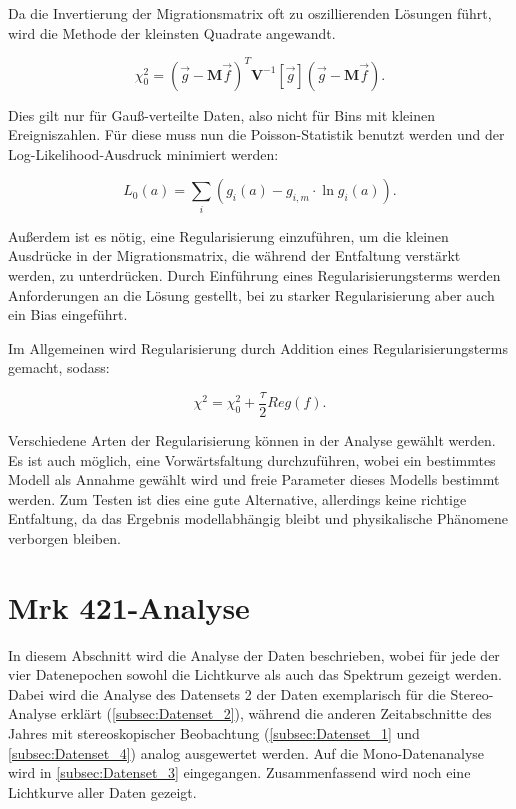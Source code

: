 Da die Invertierung der Migrationsmatrix oft zu oszillierenden Lösungen führt, wird die Methode der kleinsten Quadrate angewandt.

\begin{equation}
 \chi_0^2=(\vec{g}-\mathbf{M}\vec{f})^T \mathbf{V}^{-1}[\vec{g}](\vec{g}-\mathbf{M}\vec{f}).
\end{equation}

Dies gilt nur für Gauß-verteilte Daten, also nicht für Bins mit kleinen Ereigniszahlen.
Für diese muss nun die Poisson-Statistik benutzt werden und der Log-Likelihood-Ausdruck minimiert werden:

\begin{equation}
 L_0(a)=\sum_i (g_i(a)-g_{i,m}\cdot \ln g_i(a)).
\end{equation}

Außerdem ist es nötig, eine Regularisierung einzuführen, um die kleinen Ausdrücke in der Migrationsmatrix, die während der Entfaltung verstärkt werden, zu unterdrücken.
Durch Einführung eines Regularisierungsterms werden Anforderungen an die Lösung gestellt, bei zu starker Regularisierung aber auch ein Bias eingeführt.

Im Allgemeinen wird Regularisierung durch Addition eines Regularisierungsterms gemacht, sodass:

\begin{equation}
 \chi^2=\chi_0^2 +\frac{\tau}{2} Reg(f).
\end{equation}

Verschiedene Arten der Regularisierung können in der Analyse gewählt werden.
Es ist auch möglich, eine Vorwärtsfaltung durchzuführen, wobei ein bestimmtes Modell als Annahme gewählt wird und freie Parameter dieses Modells bestimmt werden.
Zum Testen ist dies eine gute Alternative, allerdings keine richtige Entfaltung, da das Ergebnis modellabhängig bleibt und physikalische Phänomene verborgen bleiben.

\section{Mrk 421-Analyse}
\label{Mrk421_Analyse}
In diesem Abschnitt wird die Analyse der Daten beschrieben, wobei für jede der vier Datenepochen sowohl die Lichtkurve als auch das Spektrum gezeigt werden.
Dabei wird die Analyse des Datensets 2 der Daten exemplarisch für die Stereo-Analyse erklärt (\autoref{subsec:Datenset_2}), während die anderen Zeitabschnitte des Jahres mit stereoskopischer Beobachtung (\autoref{subsec:Datenset_1} und \autoref{subsec:Datenset_4}) analog ausgewertet werden.
Auf die Mono-Datenanalyse wird in \autoref{subsec:Datenset_3} eingegangen.
Zusammenfassend wird noch eine Lichtkurve aller Daten gezeigt.


